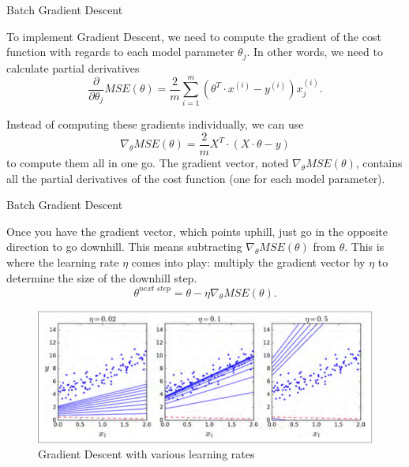 \documentclass[11pt]{beamer}
\begin{document}
\begin{frame}{Batch Gradient Descent}

To implement Gradient Descent, we need to compute the gradient of the cost function with regards to each model parameter $\theta_j$. In other words, we need to calculate partial derivatives 
$$\frac{\partial }{\partial \theta_j}MSE(\theta) = \frac{2}{m}\sum_{i=1}^m \left(\theta^T \cdot x^{(i)}-y^{(i)}\right)x^{(i)}_j.$$

Instead of computing these gradients individually, we can use 
$$ \nabla_\theta MSE(\theta)= \frac{2}{m}X^T\cdot(X\cdot \theta-y) $$
to compute them all in one go. The gradient vector, noted $\nabla_\theta MSE(\theta)$, contains all the partial derivatives of the cost function (one for each model parameter).
\end{frame}


\begin{frame}{Batch Gradient Descent}
	
	Once you have the gradient vector, which points uphill, just go in the opposite direction to go downhill. This means subtracting $\nabla_\theta MSE(\theta)$ from $\theta$. This is where the learning rate $\eta$ comes into play: multiply the gradient vector by $\eta$ to determine the size of the downhill step.
	$$\theta^{next \; step }=\theta-\eta \nabla_\theta MSE(\theta).$$
	\pause
\begin{figure}
	\centering
	\includegraphics[scale=0.29]{figure4-8}
	\caption{Gradient Descent with various learning rates}
\end{figure}		
\end{frame}
\end{document}
